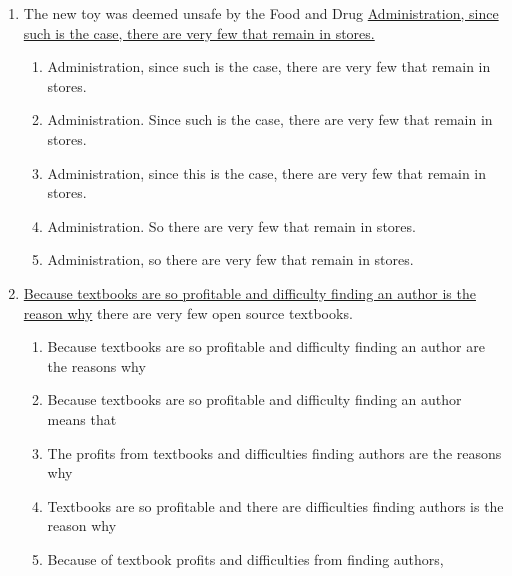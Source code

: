 \begin{enumerate}[resume]
\bigskip
\item The new toy was deemed unsafe by the Food and Drug \ul{Administration, since such is the case, there are very few that remain in stores.}

\begin{enumerate}[label=(\Alph*)]
\item Administration, since such is the case, there are very few that remain in stores.
\item Administration. Since such is the case, there are very few that remain in stores. 
\item Administration, since this is the case, there are very few that remain in stores.
\item Administration. So there are very few that remain in stores. 
\item Administration, so there are very few that remain in stores.
\end{enumerate}

\bigskip
\item \ul{Because textbooks are so profitable and difficulty finding an author is the reason why} there are very few open source textbooks. 

\begin{enumerate}[label=(\Alph*)]
\item Because textbooks are so profitable and difficulty finding an author are the reasons why
\item Because textbooks are so profitable and difficulty finding an author means that
\item The profits from textbooks and difficulties finding authors are the reasons why
\item Textbooks are so profitable and there are difficulties finding authors is the reason why
\item Because of textbook profits and difficulties from finding authors,
\end{enumerate}

\newpage
{}
\end{enumerate}
